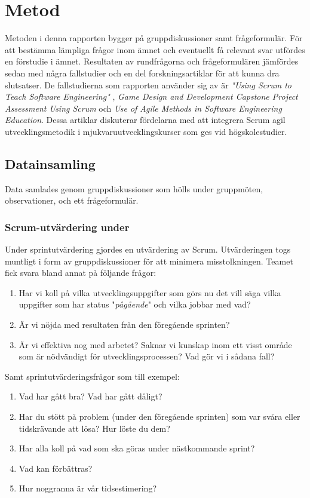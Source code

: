 \section{Metod} \label{sec:Lieth_Wahid-method}
Metoden i denna rapporten bygger på gruppdiskussioner samt frågeformulär. För att bestämma lämpliga frågor inom ämnet och eventuellt  få relevant svar utfördes en förstudie i ämnet. Resultaten av rundfrågorna och frågeformulären jämfördes sedan med några  fallstudier och en del forskningsartiklar för att kunna dra slutsatser. De fallstudierna som rapporten använder sig av är \textit{"Using Scrum to Teach Software Engineering"} \cite{Usingscr27:online}, \textit{ Game Design and Development Capstone Project Assessment Using Scrum} \cite{GameDesign} och \textit{Use of Agile Methods in Software Engineering Education}\cite{UseofAgi59:online}. Dessa artiklar diskuterar fördelarna med att integrera Scrum agil utvecklingsmetodik i mjukvaruutvecklingskurser som ges vid högskolestudier.  
\subsection{Datainsamling}\label{ds}
Data samlades genom gruppdiskussioner som hölls under gruppmöten, observationer, och ett frågeformulär. 
\subsubsection {Scrum-utvärdering under } \label{Lieth:scrumU}
Under sprintutvärdering gjordes en utvärdering av Scrum. Utvärderingen togs muntligt i form av gruppdiskussioner för att minimera misstolkningen. Teamet fick svara bland annat på följande frågor:
\begin{enumerate}
	\item Har vi koll på vilka utvecklingsuppgifter som görs nu det vill säga vilka uppgifter som har status "\textit{pågående}" och vilka jobbar med vad? 
	\item Är vi nöjda med resultaten från den föregående sprinten?
	\item Är vi effektiva nog med arbetet? Saknar vi kunskap inom ett visst område som är nödvändigt för utvecklingsprocessen? Vad gör vi i sådana fall? \label{f3}
\end{enumerate} 
Samt sprintutvärderingsfrågor som till exempel:
\begin{enumerate}
	\item Vad har gått bra? Vad har gått dåligt?
	\item Har du stött på problem (under den föregående sprinten) som var svåra eller tidskrävande att lösa? Hur löste du dem?
	\item Har alla koll på vad som ska göras under nästkommande sprint?
	\item Vad kan förbättras?
	\item Hur noggranna är vår tidsestimering?
\end{enumerate} 

